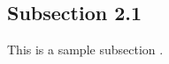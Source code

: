 \subsection{Subsection 2.1}
\label{sec:subsection2.1}
This is a sample subsection \citep{chen2016xgboost}.


